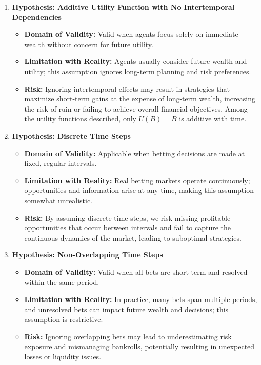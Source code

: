 \begin{enumerate}
    \item \textbf{Hypothesis: Additive Utility Function with No Intertemporal Dependencies}
        \begin{itemize}
            \item \textbf{Domain of Validity:} Valid when agents focus solely on immediate wealth without concern for future utility.
            \item \textbf{Limitation with Reality:} Agents usually consider future wealth and utility; this assumption ignores long-term planning and risk preferences.
            \item \textbf{Risk:} Ignoring intertemporal effects may result in strategies that maximize short-term gains at the expense of long-term wealth, increasing the risk of ruin or failing to achieve overall financial objectives. Among the utility functions described, only \(U(B)=B\) is additive with time.
        \end{itemize}
        
    \item \textbf{Hypothesis: Discrete Time Steps}
        \begin{itemize}
            \item \textbf{Domain of Validity:} Applicable when betting decisions are made at fixed, regular intervals.
            \item \textbf{Limitation with Reality:} Real betting markets operate continuously; opportunities and information arise at any time, making this assumption somewhat unrealistic.
            \item \textbf{Risk:} By assuming discrete time steps, we risk missing profitable opportunities that occur between intervals and fail to capture the continuous dynamics of the market, leading to suboptimal strategies.
        \end{itemize}

    \item \textbf{Hypothesis: Non-Overlapping Time Steps}
        \begin{itemize}
            \item \textbf{Domain of Validity:} Valid when all bets are short-term and resolved within the same period.
            \item \textbf{Limitation with Reality:} In practice, many bets span multiple periods, and unresolved bets can impact future wealth and decisions; this assumption is restrictive.
            \item \textbf{Risk:} Ignoring overlapping bets may lead to underestimating risk exposure and mismanaging bankrolls, potentially resulting in unexpected losses or liquidity issues.
        \end{itemize}


\end{enumerate}

